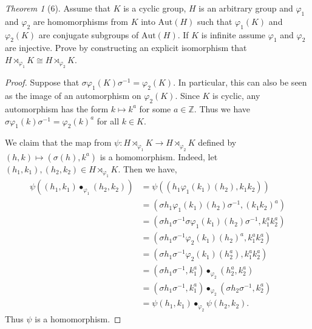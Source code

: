 \documentclass[12pt]{article}
\theoremstyle{remark}
\theoremstyle{named}
\newtheorem*{theorem}{Theorem}
\newcommand{\Aut}{\text{Aut}}
\begin{document}
\begin{theorem}[6]
    Assume that \(K\) is a cyclic group, \(H\) is an arbitrary group and \(\varphi_1\) and \(\varphi_2\) are homomorphisms from \(K\) into \(\Aut(H)\) such that \(\varphi_1(K)\) and \(\varphi_2(K)\) are conjugate subgroups of \(\Aut(H)\). If \(K\) is infinite assume \(\varphi_1\) and \(\varphi_2\) are injective. Prove by constructing an explicit isomorphism that \(H \rtimes_{\varphi_1} K \cong H \rtimes_{\varphi_2} K\).
\end{theorem}

\begin{proof}
    Suppose that \(\sigma \varphi_1(K) \sigma^{-1} = \varphi_2(K)\). In particular, this can also be seen as the image of an automorphism on \(\varphi_2(K)\). Since \(K\) is cyclic, any automorphism has the form \(k \mapsto k^a\) for some \(a \in \mathbb Z\). Thus we have \(\sigma \varphi_1(k) \sigma^{-1} = \varphi_2(k)^a\) for all \(k \in K\). 

    We claim that the map from \(\psi : H \rtimes_{\varphi_1} K \to H \rtimes_{\varphi_2} K\) defined by \((h, k) \mapsto (\sigma(h), k^a)\) is a homomorphism. Indeed, let \((h_1, k_1), (h_2, k_2) \in H \rtimes_{\varphi_1} K\). Then we have,
    \begin{align*}
        \psi((h_1, k_1) \bullet_{\varphi_1} (h_2, k_2)) &= \psi((h_1\varphi_1(k_1)(h_2), k_1 k_2)) \\
        &= (\sigma h_1\varphi_1(k_1)(h_2) \sigma^{-1}, (k_1 k_2)^a) \\ 
        &= (\sigma h_1 \sigma^{-1} \sigma \varphi_1(k_1)(h_2) \sigma^{-1}, k_1^a k_2^a) \\
        &= (\sigma h_1 \sigma^{-1} \varphi_2(k_1)(h_2)^a, k_1^a k_2^a) \\ 
        &= (\sigma h_1 \sigma^{-1} \varphi_2(k_1)(h_2^a), k_1^a k_2^a) \\ 
        &= (\sigma h_1 \sigma^{-1}, k_1^a) \bullet_{\varphi_2} (h_2^a, k_2^a) \\ 
        &= (\sigma h_1 \sigma^{-1}, k_1^a) \bullet_{\varphi_2} (\sigma h_2 \sigma^{-1}, k_2^a) \\ 
        &= \psi(h_1, k_1) \bullet_{\varphi_2} \psi(h_2, k_2).
    \end{align*}
    Thus \(\psi\) is a homomorphism. 


\end{proof}
\end{document}
